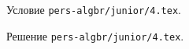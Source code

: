 \problem
Условие \texttt{pers-algbr/junior/4.tex}.

\solution Решение \texttt{pers-algbr/junior/4.tex}.
\endproblem
